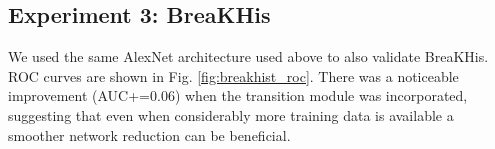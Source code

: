 \documentclass[runningheads,a4paper]{llncs}
\begin{document}
%
%

\subsection{Experiment 3: BreaKHis}
\label{sec:breakhist}

We used the same AlexNet architecture used above to also validate BreaKHis. ROC curves are shown in Fig. \ref{fig:breakhist_roc}. There was a noticeable improvement (AUC+=$0.06$) when the transition module was incorporated, suggesting that even when considerably more training data is available a smoother network reduction can be beneficial.
\end{document}
